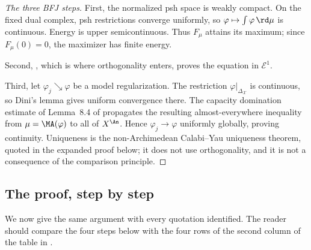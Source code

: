 \begin{proof}[The three BFJ steps]
First, the normalized psh space is weakly compact.  On the fixed dual
complex, psh restrictions converge uniformly, so
$\varphi\mapsto\int\varphi\,\rd \mu$ is continuous.  Energy is upper
semicontinuous.  Thus $F_\mu$ attains its maximum; since
$F_\mu(0)=0$, the maximizer has finite energy.

Second, , which is where
orthogonality enters, proves the equation in $\mathcal E^1$.

Third, let $\varphi_j\searrow\varphi$ be a model regularization.  The
restriction $\varphi|_{\Delta_{\mathcal X}}$ is continuous, so Dini's
lemma gives uniform convergence there.  The capacity domination estimate
of Lemma~8.4 of \cite{BFJ15} propagates the resulting almost-everywhere
inequality from $\mu=\MA(\varphi)$ to all of $X^{\An}$.  Hence
$\varphi_j\to\varphi$ uniformly globally, proving continuity.  Uniqueness
is the non-Archimedean Calabi--Yau uniqueness theorem, quoted in the
expanded proof below; it does not use orthogonality, and it is not a
consequence of the comparison principle.
\end{proof}

\subsection{The proof, step by step}
\label{sec:ch28-bfj-proof}

We now give the same argument with every quotation identified.  The reader
should compare the four steps below with the four rows of the second column
of the table in .

